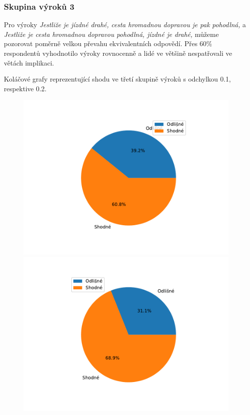 \subsubsection{Skupina výrok\r u 3}
Pro výroky \textit{\clqq Jestliže je jízdné drahé, cesta hromadnou dopravou je pak pohodlná,\crqq } \space a \textit{\clqq Jestliže je cesta hromadnou dopravou pohodlná, jízdné je drahé,\crqq } \space m\r užeme pozorovat poměrně velkou převahu ekvivalentních odpovědí. Přes $60 $\space$ \%$ respondent\r u vyhodnotilo výroky rovnocenně a lidé ve většině nespatřovali ve větách implikaci.
\begin{graph}
Koláčové grafy reprezentující shodu ve třetí skupině výrok\r u s odchylkou 0.1, respektive 0.2.
    \begin{figure}[H]
                \includegraphics[scale=0.5]{template-fig/group2.pdf}
                \includegraphics[scale=0.5]{template-fig/group22.pdf}
            \end{figure}
\end{graph}
